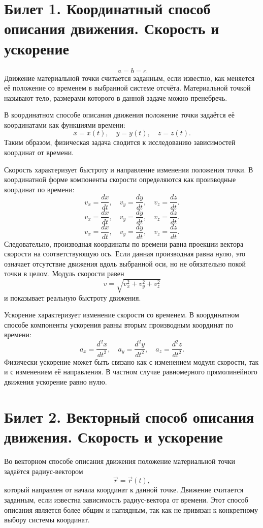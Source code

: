 \documentclass[a4paper,12pt]{article}
\begin{document}
\section*{Билет 1. Координатный способ описания движения. Скорость и ускорение}
\begin{equation*}
	a = b = c
\end{equation*}
Движение материальной точки считается заданным, если известно, как меняется её положение со временем в выбранной системе отсчёта. Материальной точкой называют тело, размерами которого в данной задаче можно пренебречь. 

В координатном способе описания движения положение точки задаётся её координатами как функциями времени:
\[
x = x(t), \quad y = y(t), \quad z = z(t).
\]
Таким образом, физическая задача сводится к исследованию зависимостей координат от времени.

Скорость характеризует быстроту и направление изменения положения точки. В координатной форме компоненты скорости определяются как производные координат по времени:
\[
v_x = \frac{dx}{dt}, \quad
v_y = \frac{dy}{dt}, \quad
v_z = \frac{dz}{dt}.
\]
\[
v_x = \frac{dx}{dt}, \quad
v_y = \frac{dy}{dt}, \quad
v_z = \frac{dz}{dt}.
\]
\[
v_x = \frac{dx}{dt}, \quad
v_y = \frac{dy}{dt}, \quad
v_z = \frac{dz}{dt}.
\]
Следовательно, производная координаты по времени равна проекции вектора скорости на соответствующую ось. Если данная производная равна нулю, это означает отсутствие движения вдоль выбранной оси, но не обязательно покой точки в целом. Модуль скорости равен
\[
v = \sqrt{v_x^2 + v_y^2 + v_z^2}
\]
и показывает реальную быстроту движения.

Ускорение характеризует изменение скорости со временем. В координатном способе компоненты ускорения равны вторым производным координат по времени:
\[
a_x = \frac{d^2 x}{dt^2}, \quad
a_y = \frac{d^2 y}{dt^2}, \quad
a_z = \frac{d^2 z}{dt^2}.
\]
Физически ускорение может быть связано как с изменением модуля скорости, так и с изменением её направления. В частном случае равномерного прямолинейного движения ускорение равно нулю.

\bigskip

\section*{Билет 2. Векторный способ описания движения. Скорость и ускорение}

Во векторном способе описания движения положение материальной точки задаётся радиус-вектором
\[
\vec r = \vec r(t),
\]
который направлен от начала координат к данной точке. Движение считается заданным, если известна зависимость радиус-вектора от времени. Этот способ описания является более общим и наглядным, так как не привязан к конкретному выбору системы координат.
\end{document}
